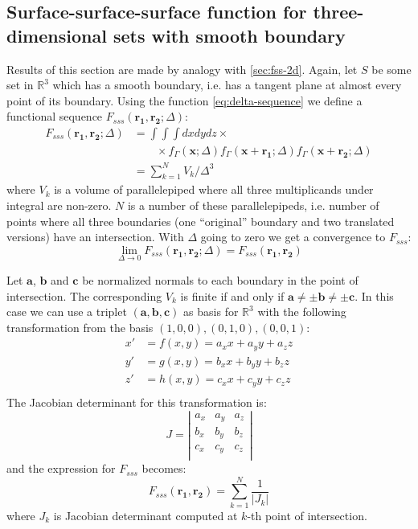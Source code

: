 \documentclass[reprint,amsmath,amssymb,aps,pre,showkeys,showpacs]{revtex4-1}
\begin{document}
\subsection{Surface-surface-surface function for three-dimensional sets with
  smooth boundary}
\label{sec:fsss-3d}
Results of this section are made by analogy with \cref{sec:fss-2d}. Again, let
$S$ be some set in $\mathbb{R}^3$ which has a smooth boundary, i.e. has a
tangent plane at almost every point of its boundary. Using the function
\cref{eq:delta-sequence} we define a functional sequence
$F_{sss}(\bm{r_1}, \bm{r_2}; \Delta)$:
\begin{align*}
  F_{sss}(\bm{r_1}, \bm{r_2}; \Delta) &= \int\int\int dx dy dz \times \\
  &\qquad \times f_\Gamma(\bm{x}; \Delta) f_\Gamma(\bm{x} + \bm{r_1}; \Delta)
  f_\Gamma(\bm{x} + \bm{r_2}; \Delta) \\
  &= \sum_{k=1}^N V_k/\Delta^3
\end{align*}
where $V_k$ is a volume of parallelepiped where all three multiplicands under integral
are non-zero. $N$ is a number of these parallelepipeds, i.e. number of points
where all three boundaries (one ``original'' boundary and two translated
versions) have an intersection. With $\Delta$ going to zero we get a convergence
to $F_{sss}$:
\begin{equation*}
  \lim_{\Delta \to 0} F_{sss}(\bm{r_1}, \bm{r_2}; \Delta) = F_{sss}(\bm{r_1},
  \bm{r_2})
\end{equation*}

Let $\bm{a}$, $\bm{b}$ and $\bm{c}$ be normalized normals to each boundary in
the point of intersection. The corresponding $V_k$ is finite if and only if
$\bm{a} \ne \pm \bm{b} \ne \pm \bm{c}$. In this case we can use a triplet
$(\bm{a}, \bm{b}, \bm{c})$ as basis for $\mathbb{R}^3$ with the following
transformation from the basis $(1,0,0), (0,1,0), (0, 0, 1)$:
\begin{align*}
  x' &= f(x, y) = a_x x + a_y y + a_z z \\
  y' &= g(x, y) = b_x x + b_y y + b_z z \\
  z' &= h(x, y) = c_x x + c_y y + c_z z \\
\end{align*}
The Jacobian determinant for this transformation is:
\begin{equation*}
  J = \left|
  \begin{array}{ccc}
    a_x & a_y & a_z \\
    b_x & b_y & b_z \\
    c_x & c_y & c_z \\
  \end{array}
  \right|
\end{equation*}
and the expression for $F_{sss}$ becomes:
\begin{equation}
  F_{sss}(\bm{r_1}, \bm{r_2}) = \sum_{k=1}^N \frac{1}{|J_k|} \label{eq:fsss-3d}
\end{equation}
where $J_k$ is Jacobian determinant computed at $k$-th point of
intersection.
\end{document}
